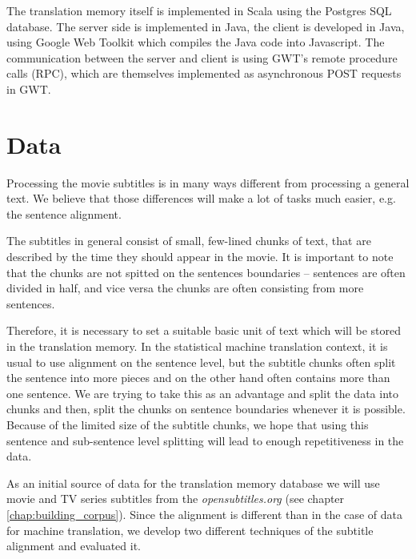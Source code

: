The translation memory itself is implemented in Scala using the Postgres SQL database. The server side is implemented in Java, the client is developed in Java, using Google Web Toolkit which compiles the Java code into Javascript. The communication between the server and client is using GWT's remote procedure calls (RPC), which are themselves implemented as asynchronous POST requests in GWT.

\section{Data}

Processing the movie subtitles is in many ways different from processing a general text. We believe that those differences will make a lot of tasks much easier, e.g. the sentence alignment.

The subtitles in general consist of small, few-lined chunks of text, that are described by the time they should appear in the movie. It is important to note that the chunks are not spitted on the sentences boundaries -- sentences are often divided in half, and vice versa the chunks are often consisting from more sentences.    

Therefore, it is necessary to set a suitable basic unit of text which will be stored in the translation memory. In the statistical machine translation context, it is usual to use alignment on the sentence level, but the subtitle chunks often split the sentence into more pieces and on the other hand often contains more than one sentence. We are trying to take this as an advantage and split the data into chunks and then, split the chunks on sentence boundaries whenever it is possible. Because of the limited size of the subtitle chunks, we hope that using this sentence and sub-sentence level splitting will lead to enough repetitiveness in the data.

As an initial source of data for the translation memory database we will use movie and TV series subtitles from the {\it opensubtitles.org} (see chapter \ref{chap:building_corpus}). Since the alignment is different than in the case of data for machine translation, we develop two different techniques of the subtitle alignment and evaluated it.